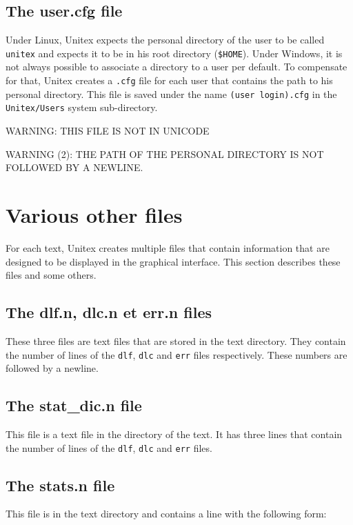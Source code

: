 \subsection{The user.cfg file}
Under Linux, Unitex expects the personal directory of the user to be called
\verb+unitex+ and expects it to be in his root directory (\verb+$HOME+). Under
Windows, it is not always possible to associate a directory to a user per
default. To compensate for that, Unitex creates a \verb+.cfg+ file for each user
that contains the path to his personal directory. This file is saved under the
name \verb+(user login).cfg+ in the \verb+Unitex/Users+ system sub-directory.

\bigskip
\noindent WARNING:  THIS FILE IS NOT IN UNICODE

\bigskip
\noindent WARNING (2): THE PATH OF THE PERSONAL
DIRECTORY IS NOT FOLLOWED BY A NEWLINE.

\section{Various other files}
For each text, Unitex creates multiple files that contain information that are
designed to be displayed in the graphical interface. This section describes these
files and some others.


\subsection{The dlf.n, dlc.n et err.n files}
These three files are text files that are stored in the text directory. They
contain the number of lines of the \verb+dlf+, \verb+dlc+ and \verb+err+ files
respectively. These numbers are followed by a newline.


\subsection{The stat\_dic.n file}
This file is a text file in the directory of the text. It has three lines that
contain the number of lines of the \verb+dlf+, \verb+dlc+ and \verb+err+ files.

\subsection{The stats.n file}
This file is in the text directory and contains a line with the following form:


